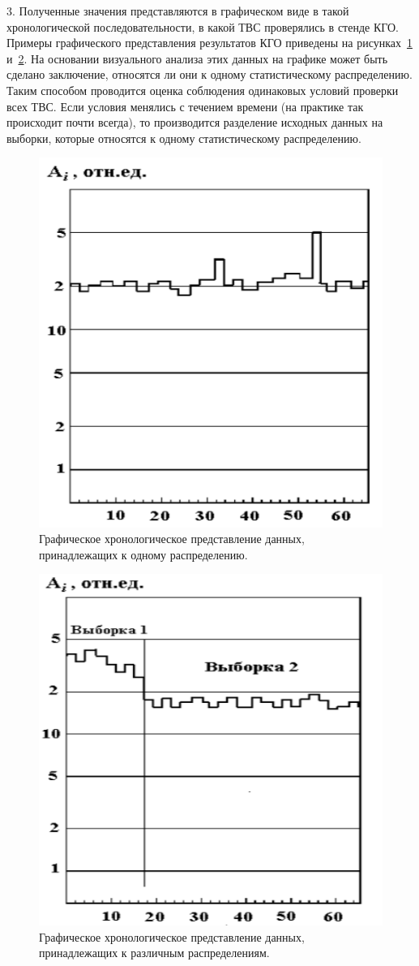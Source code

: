 3. Полученные значения представляются в графическом виде в такой
хронологической последовательности, в какой ТВС проверялись в стенде
КГО. Примеры графического представления результатов КГО приведены на
рисунках~\ref{fig:ris1} и~\ref{fig:ris2}. На основании визуального анализа этих данных на графике
может быть сделано заключение, относятся ли они к одному статистическому
распределению. Таким способом проводится оценка соблюдения одинаковых
условий проверки всех ТВС. Если условия менялись с течением времени (на
практике так происходит почти всегда), то производится разделение исходных данных на выборки, которые относятся к одному статистическому распределению.

\begin{figure}[H]
	\centering
	\includegraphics[width=0.5\linewidth]{pics/ris1} %
	\caption{Графическое хронологическое представление данных, принадлежащих к одному распределению.\cite{RD}}
	\label{fig:ris1} %
\end{figure}

\begin{figure}[H]
	\centering
	\includegraphics[width=0.5\linewidth]{pics/ris2} %
	\caption{Графическое хронологическое представление данных, принадлежащих к различным распределениям.\cite{RD}}
	\label{fig:ris2} %
\end{figure}

